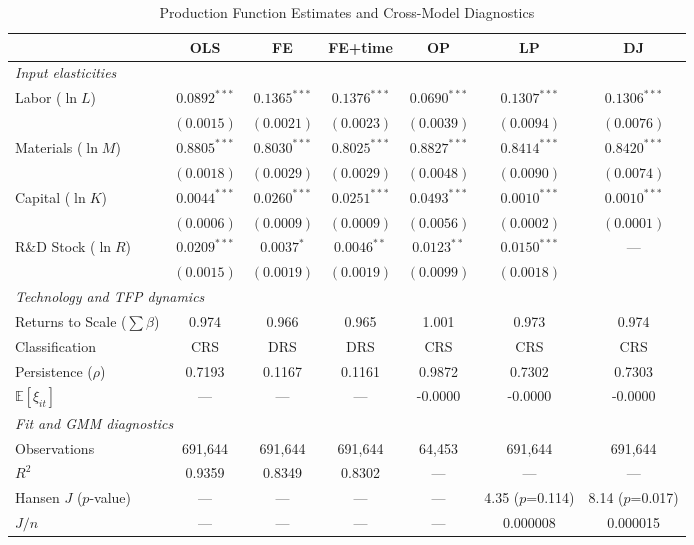 \documentclass[a4paper, 12pt]{article}
\begin{document}
\begin{table}[htbp]
\centering
\caption{Production Function Estimates and Cross-Model Diagnostics}
\label{tab:main_results}
\begin{tabular}{lcccccc}
\toprule
 & OLS & FE & FE+time & OP & LP & DJ \\
\midrule
\multicolumn{7}{l}{\textit{Input elasticities}} \\
  Labor ($\ln L$) & $0.0892^{***}$ & $0.1365^{***}$ & $0.1376^{***}$ & $0.0690^{***}$ & $0.1307^{***}$ & $0.1306^{***}$ \\
   & $(0.0015)$ & $(0.0021)$ & $(0.0023)$ & $(0.0039)$ & $(0.0094)$ & $(0.0076)$ \\
  Materials ($\ln M$) & $0.8805^{***}$ & $0.8030^{***}$ & $0.8025^{***}$ & $0.8827^{***}$ & $0.8414^{***}$ & $0.8420^{***}$ \\
   & $(0.0018)$ & $(0.0029)$ & $(0.0029)$ & $(0.0048)$ & $(0.0090)$ & $(0.0074)$ \\
  Capital ($\ln K$) & $0.0044^{***}$ & $0.0260^{***}$ & $0.0251^{***}$ & $0.0493^{***}$ & $0.0010^{***}$ & $0.0010^{***}$ \\
   & $(0.0006)$ & $(0.0009)$ & $(0.0009)$ & $(0.0056)$ & $(0.0002)$ & $(0.0001)$ \\
  R\&D Stock ($\ln R$) & $0.0209^{***}$ & $0.0037^{*}$ & $0.0046^{**}$ & $0.0123^{**}$ & $0.0150^{***}$ & --- \\
   & $(0.0015)$ & $(0.0019)$ & $(0.0019)$ & $(0.0099)$ & $(0.0018)$ &  \\
\midrule
\multicolumn{7}{l}{\textit{Technology and TFP dynamics}} \\
  Returns to Scale ($\sum \beta$) & 0.974 & 0.966 & 0.965 & 1.001 & 0.973 & 0.974 \\
  \quad Classification & CRS & DRS & DRS & CRS & CRS & CRS \\
  Persistence ($\rho$) & 0.7193 & 0.1167 & 0.1161 & 0.9872 & 0.7302 & 0.7303 \\
  $\mathbb{E}[\xi_{it}]$ & --- & --- & --- & -0.0000 & -0.0000 & -0.0000 \\
\midrule
\multicolumn{7}{l}{\textit{Fit and GMM diagnostics}} \\
  Observations & 691,644 & 691,644 & 691,644 & 64,453 & 691,644 & 691,644 \\
  $R^2$ & 0.9359 & 0.8349 & 0.8302 & --- & --- & --- \\
  Hansen $J$ ($p$-value) & --- & --- & --- & --- & 4.35 ($p$=0.114) & 8.14 ($p$=0.017) \\
  $J/n$ & --- & --- & --- & --- & 0.000008 & 0.000015 \\

\end{tabular}
\end{table}
\end{document}
